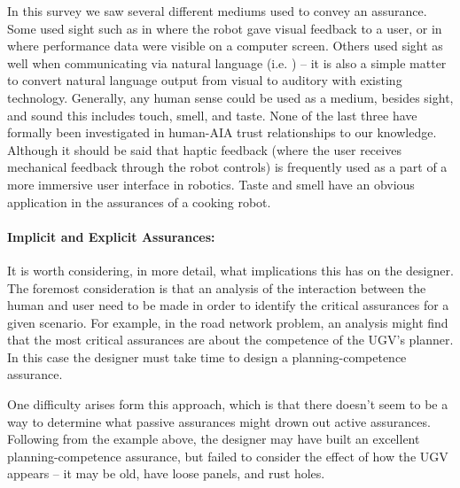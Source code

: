     In this survey we saw several different mediums used to convey an assurance. Some used sight such as in \cite{Chadalavada2015-wx} where the robot gave visual feedback to a user, or in \cite{Muir1996-gt} where performance data were visible on a computer screen. Others used sight as well when communicating via natural language (i.e. \cite{Wang2016-id}) -- it is also a simple matter to convert natural language output from visual to auditory with existing technology. Generally, any human sense could be used as a medium, besides sight, and sound this includes touch, smell, and taste. None of the last three have formally been investigated in human-AIA trust relationships to our knowledge. Although it should be said that haptic feedback (where the user receives mechanical feedback through the robot controls) is frequently used as a part of a more immersive user interface in robotics. Taste and smell have an obvious application in the assurances of a cooking robot.


    \paragraph{Implicit and Explicit Assurances:}  It is worth considering, in more detail, what implications this has on the designer. The foremost consideration is that an analysis of the interaction between the human and user need to be made in order to identify the critical assurances for a given scenario. For example, in the road network problem, an analysis might find that the most critical assurances are about the competence of the UGV's planner. In this case the designer must take time to design a planning-competence assurance.

    One difficulty arises form this approach, which is that there doesn't seem to be a way to determine what passive assurances might drown out active assurances. Following from the example above, the designer may have built an excellent planning-competence assurance, but failed to consider the effect of how the UGV appears -- it may be old, have loose panels, and rust holes. 

